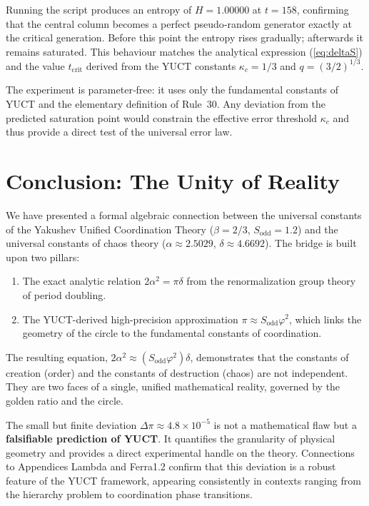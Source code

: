 \documentclass[12pt,a4paper]{article}
\begin{document}
{Running the script produces an entropy of \(H = 1.00000\) at \(t = 158\),
confirming that the central column becomes a perfect pseudo‑random generator
exactly at the critical generation. Before this point the entropy rises
gradually; afterwards it remains saturated. This behaviour matches the
analytical expression (\ref{eq:deltaS}) and the value \(t_{\mathrm{crit}}\)
derived from the YUCT constants \(\kappa_c = 1/3\) and \(q = (3/2)^{1/3}\).

The experiment is parameter‑free: it uses only the fundamental constants of
YUCT and the elementary definition of Rule~30. Any deviation from the
predicted saturation point would constrain the effective error threshold
\(\kappa_c\) and thus provide a direct test of the universal error law.

	\section{Conclusion: The Unity of Reality}
	
	We have presented a formal algebraic connection between the universal constants of the Yakushev Unified Coordination Theory (\(\beta = 2/3\), \(S_{\mathrm{odd}} = 1.2\)) and the universal constants of chaos theory (\(\alpha \approx 2.5029\), \(\delta \approx 4.6692\)). The bridge is built upon two pillars:
	\begin{enumerate}
		\item The exact analytic relation \(2\alpha^2 = \pi \delta\) from the renormalization group theory of period doubling.
		\item The YUCT-derived high-precision approximation \(\pi \approx S_{\mathrm{odd}}\varphi^2\), which links the geometry of the circle to the fundamental constants of coordination.
	\end{enumerate}
	
	The resulting equation, \(2\alpha^2 \approx (S_{\mathrm{odd}}\varphi^2)\delta\), demonstrates that the constants of creation (order) and the constants of destruction (chaos) are not independent. They are two faces of a single, unified mathematical reality, governed by the golden ratio and the circle.
	
	The small but finite deviation \(\Delta\pi \approx 4.8\times10^{-5}\) is not a mathematical flaw but a \textbf{falsifiable prediction of YUCT}. It quantifies the granularity of physical geometry and provides a direct experimental handle on the theory. Connections to Appendices Lambda and Ferra1.2 confirm that this deviation is a robust feature of the YUCT framework, appearing consistently in contexts ranging from the hierarchy problem to coordination phase transitions.
	
}
\end{document}

